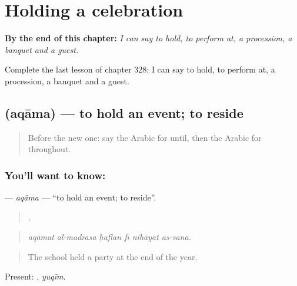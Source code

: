 
\chapter{Holding a celebration}
\label{ch:ar-holding-a-celebration}

\begin{chapteropening}
\textbf{By the end of this chapter:} \emph{I can say to hold, to perform at, a procession, a banquet and a guest.}

Complete the last lesson of chapter 328: I can say to hold, to perform at, a procession, a banquet and a guest.
\end{chapteropening}

\section[\texorpdfstring{\ar{أقام} (aqāma)}{أقام (aqāma)}]{ (aqāma) — to hold an event; to reside}

\label{lesson:AR-C328-aqama}



\begin{quote}
Before the new one: say the Arabic for until, then the Arabic for throughout.
\end{quote}

\subsection*{You'll want to know: }
\textbf{} — \emph{aqāma} — \textquotedblleft{}to hold an event; to reside\textquotedblright{}.

\begin{quote}
     .
\end{quote}

\begin{quote}
\emph{aqāmat al-madrasa ḥaflan fī nihāyat as-sana.}
\end{quote}

\begin{quote}
The school held a party at the end of the year.
\end{quote}

Present: , \emph{yuqīm}.

